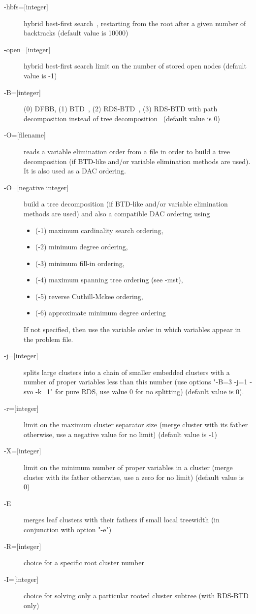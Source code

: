 \documentclass{article}
\begin{document}
\begin{description}
\item[{-hbfs=[integer]}] hybrid best-first search~\cite{Katsirelos15a}, restarting from the
  root after a given number of backtracks (default value is 10000)
\item[{-open=[integer]}] hybrid best-first search limit on the number
  of stored open nodes (default value is -1)
\item[{-B=[integer]}] (0) DFBB, (1) BTD~\cite{Schiex06a}, (2) RDS-BTD~\cite{Sanchez09a}, (3) RDS-BTD with
  path decomposition instead of tree decomposition~\cite{Sanchez09a} (default value is
  0)
\item[{-O=[filename]}] reads a variable elimination order from a file
  in order to build a tree decomposition (if BTD-like and/or variable
  elimination methods are used). It is also used as a DAC ordering.
\item[{-O=[negative integer]}] build a tree decomposition (if BTD-like
  and/or variable elimination methods are used) and also a compatible
  DAC ordering using
  \begin{itemize}
    \item (-1) maximum cardinality search ordering, 
    \item (-2) minimum degree ordering, 
    \item (-3) minimum fill-in ordering,
    \item (-4) maximum spanning tree ordering (see -mst), 
    \item (-5) reverse Cuthill-Mckee ordering, 
    \item (-6) approximate minimum degree ordering
    \end{itemize}
    If not specified, then use the variable order in which variables appear in the problem file.
\item[{-j=[integer]}] splits large clusters into a chain of smaller embedded clusters with a number of proper variables less than this number (use options "-B=3 -j=1 -svo -k=1" for pure RDS, use value 0 for no splitting) (default value is 0).
\item[{-r=[integer]}] limit on the maximum cluster separator size (merge cluster with its father otherwise, use a negative value for no limit) (default value is -1)
\item[{-X=[integer]}] limit on the minimum number of proper variables in a cluster (merge cluster with its father otherwise, use a zero for no limit) (default value is 0)
\item[{-E}] merges leaf clusters with their fathers if small local treewidth (in conjunction with option "-e")
\item[{-R=[integer]}] choice for a specific root cluster number
\item[{-I=[integer]}] choice for solving only a particular rooted cluster subtree (with RDS-BTD only)
 \end{description}
 
\end{document}
